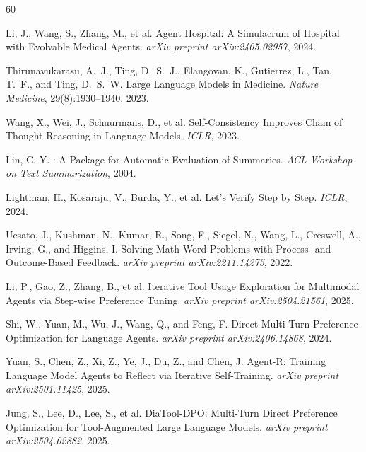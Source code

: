 \documentclass{article}
\begin{document}
\begin{thebibliography}{60}

Li, J., Wang, S., Zhang, M., et al.
\newblock Agent Hospital: A Simulacrum of Hospital with Evolvable Medical Agents.
\newblock \emph{arXiv preprint arXiv:2405.02957}, 2024.

Thirunavukarasu, A.~J., Ting, D.~S.~J., Elangovan, K., Gutierrez, L., Tan, T.~F., and Ting, D.~S.~W.
\newblock Large Language Models in Medicine.
\newblock \emph{Nature Medicine}, 29(8):1930--1940, 2023.

Wang, X., Wei, J., Schuurmans, D., et al.
\newblock Self-Consistency Improves Chain of Thought Reasoning in Language Models.
\newblock \emph{ICLR}, 2023.

Lin, C.-Y.
: A Package for Automatic Evaluation of Summaries.
\newblock \emph{ACL Workshop on Text Summarization}, 2004.


Lightman, H., Kosaraju, V., Burda, Y., et al.
\newblock Let's Verify Step by Step.
\newblock \emph{ICLR}, 2024.

Uesato, J., Kushman, N., Kumar, R., Song, F., Siegel, N., Wang, L., Creswell, A., Irving, G., and Higgins, I.
\newblock Solving Math Word Problems with Process- and Outcome-Based Feedback.
\newblock \emph{arXiv preprint arXiv:2211.14275}, 2022.


Li, P., Gao, Z., Zhang, B., et al.
\newblock Iterative Tool Usage Exploration for Multimodal Agents via Step-wise Preference Tuning.
\newblock \emph{arXiv preprint arXiv:2504.21561}, 2025.

Shi, W., Yuan, M., Wu, J., Wang, Q., and Feng, F.
\newblock Direct Multi-Turn Preference Optimization for Language Agents.
\newblock \emph{arXiv preprint arXiv:2406.14868}, 2024.

Yuan, S., Chen, Z., Xi, Z., Ye, J., Du, Z., and Chen, J.
\newblock Agent-R: Training Language Model Agents to Reflect via Iterative Self-Training.
\newblock \emph{arXiv preprint arXiv:2501.11425}, 2025.

Jung, S., Lee, D., Lee, S., et al.
\newblock DiaTool-DPO: Multi-Turn Direct Preference Optimization for Tool-Augmented Large Language Models.
\newblock \emph{arXiv preprint arXiv:2504.02882}, 2025.


\end{thebibliography}
\end{document}
